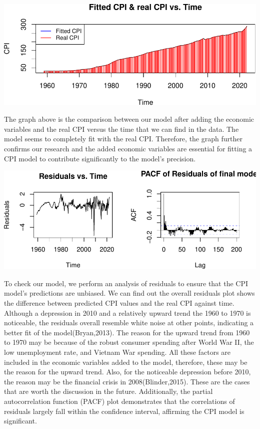 \documentclass[
  man,floatsintext,
  man]{apa6}
\begin{document}
\includegraphics{stat429_group2_final_proj_files/figure-latex/unnamed-chunk-5-1.pdf}

The graph above is the comparison between our model after adding the economic variables and the real CPI versus the time that we can find in the data. The model seems to completely fit with the real CPI. Therefore, the graph further confirms our research and the added economic variables are essential for fitting a CPI model to contribute significantly to the model's precision.

\includegraphics{stat429_group2_final_proj_files/figure-latex/unnamed-chunk-6-1.pdf}

To check our model, we perform an analysis of residuals to ensure that the CPI model's predictions are unbiased. We can find out the overall residuals plot shows the difference between predicted CPI values and the real CPI against time. Although a depression in 2010 and a relatively upward trend the 1960 to 1970 is noticeable, the residuals overall resemble white noise at other points, indicating a better fit of the model(Bryan,2013). The reason for the upward trend from 1960 to 1970 may be because of the robust consumer spending after World War II, the low unemployment rate, and Vietnam War spending. All these factors are included in the economic variables added to the model, therefore, these may be the reason for the upward trend. Also, for the noticeable depression before 2010, the reason may be the financial crisis in 2008(Blinder,2015). These are the cases that are worth the discussion in the future. Additionally, the partial autocorrelation function (PACF) plot demonstrates that the correlations of residuals largely fall within the confidence interval, affirming the CPI model is significant.
\end{document}
